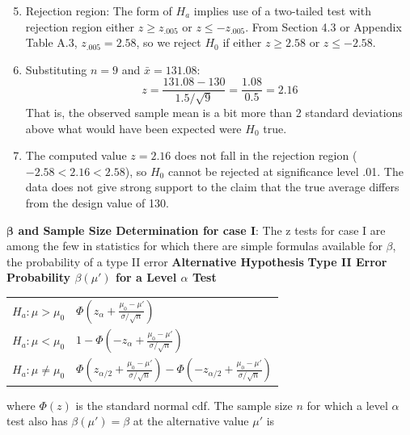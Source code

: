 \documentclass{report}
\begin{document}
\begin{itemize}
\begin{enumerate}
\[            \]
    \end{enumerate}
    \bigbreak \noindent 
    \begin{enumerate}
        \setcounter{enumi}{4}
        \item Rejection region: The form of \( H_a \) implies use of a two-tailed test with rejection region either \( z \geq z_{.005} \) or \( z \leq -z_{.005} \). From Section 4.3 or Appendix Table A.3, \( z_{.005} = 2.58 \), so we reject \( H_0 \) if either \( z \geq 2.58 \) or \( z \leq -2.58 \).
        \item Substituting \( n = 9 \) and \( \bar{x} = 131.08 \):
            \[
                z = \frac{131.08 - 130}{1.5 / \sqrt{9}} = \frac{1.08}{0.5} = 2.16
            \]
            That is, the observed sample mean is a bit more than 2 standard deviations above what would have been expected were \( H_0 \) true.
        \item The computed value \( z = 2.16 \) does not fall in the rejection region (\(-2.58 < 2.16 < 2.58\)), so \( H_0 \) cannot be rejected at significance level .01. The data does not give strong support to the claim that the true average differs from the design value of 130.
    \end{enumerate}
    \bigbreak \noindent 
    \textbf{$\mathbf{\beta}$ and Sample Size Determination for case I}: The z tests for case I are among the few in statistics for which there are simple formulas available for $\beta$, the probability of a type II error
    \bigbreak \noindent 
    \noindent
    \textbf{Alternative Hypothesis} \hspace{0.5cm} \textbf{Type II Error Probability \( \beta(\mu') \) for a Level \( \alpha \) Test}
    \bigbreak \noindent 
    \begin{tabular}{>{\bfseries}l l}
        $H_a: \mu > \mu_0$ & $\Phi \left( z_\alpha + \frac{\mu_0 - \mu'}{\sigma / \sqrt{n}} \right)$ \\
        $H_a: \mu < \mu_0$ & $1 - \Phi \left( -z_\alpha + \frac{\mu_0 - \mu'}{\sigma / \sqrt{n}} \right)$ \\
        $H_a: \mu \neq \mu_0$ & $\Phi \left( z_{\alpha/2} + \frac{\mu_0 - \mu'}{\sigma / \sqrt{n}} \right) - \Phi \left( -z_{\alpha/2} + \frac{\mu_0 - \mu'}{\sigma / \sqrt{n}} \right)$ \\
    \end{tabular}
    \bigbreak \noindent 
    where \( \Phi(z) \) is the standard normal cdf.
    \bigbreak \noindent 
    The sample size \( n \) for which a level \( \alpha \) test also has \( \beta(\mu') = \beta \) at the alternative value \( \mu' \) is

\end{itemize}
\end{document}
